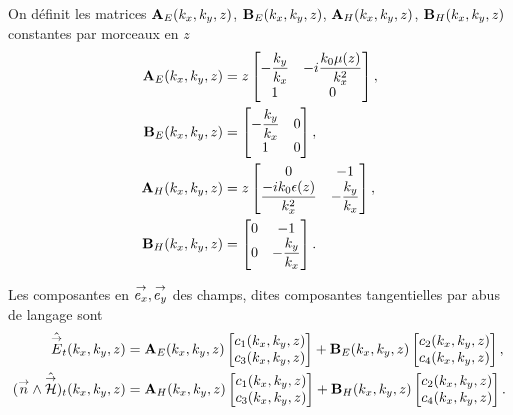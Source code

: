 

  On définit les matrices \(\mathbf{A}_{E}(k_x,k_y,z)\), \(\mathbf{B}_{E}(k_x,k_y,z)\), \(\mathbf{A}_{H}(k_x,k_y,z)\), \(\mathbf{B}_{H}(k_x,k_y,z)\) constantes par morceaux en \(z\)
  \begin{align*}
    \mathbf{A}_{E}(k_x,k_y,z) &= z
    \begin{bmatrix}
      -\dfrac{k_y}{k_x} & -i\dfrac{k_0\mu(z)}{k_x^2}
      \\
      1 & 0
    \end{bmatrix},
    \\
    \mathbf{B}_{E}(k_x,k_y,z) &= 
    \begin{bmatrix}
      -\dfrac{k_y}{k_x} & 0
      \\
      1 & 0
    \end{bmatrix},
    \\
    \mathbf{A}_{H}(k_x,k_y,z) &= z
    \begin{bmatrix}
      0 & -1
      \\
      \dfrac{-ik_0\epsilon(z)}{k_x^2} & -\dfrac{k_y}{k_x}
    \end{bmatrix},
    \\
    \mathbf{B}_{H}(k_x,k_y,z) &= 
    \begin{bmatrix}
      0 & -1
      \\
      0 & -\dfrac{k_y}{k_x}
    \end{bmatrix}.
  \end{align*}

  Les composantes en \({\overset{\rightarrow}{e_x}},{\overset{\rightarrow}{e_y}}\) des champs, dites composantes tangentielles par abus de langage sont
  \begin{align*}
      \hat{{\overset{\rightarrow}{E}}}_t(k_x,k_y,z) &= \mathbf{A}_E(k_x,k_y,z) \begin{bmatrix}c_1(k_x,k_y,z) \\ c_3(k_x,k_y,z)\end{bmatrix} + \mathbf{B}_E(k_x,k_y,z) \begin{bmatrix}c_2(k_x,k_y,z) \\ c_4(k_x,k_y,z)\end{bmatrix},
      \\
      ({\overset{\rightarrow}{n}} \wedge \hat{{\overset{\rightarrow}{\mathcal{H}}}})_t(k_x,k_y,z) &= \mathbf{A}_H(k_x,k_y,z) \begin{bmatrix}c_1(k_x,k_y,z) \\ c_3(k_x,k_y,z)\end{bmatrix} + \mathbf{B}_H(k_x,k_y,z) \begin{bmatrix}c_2(k_x,k_y,z) \\ c_4(k_x,k_y,z)\end{bmatrix}.
  \end{align*}


